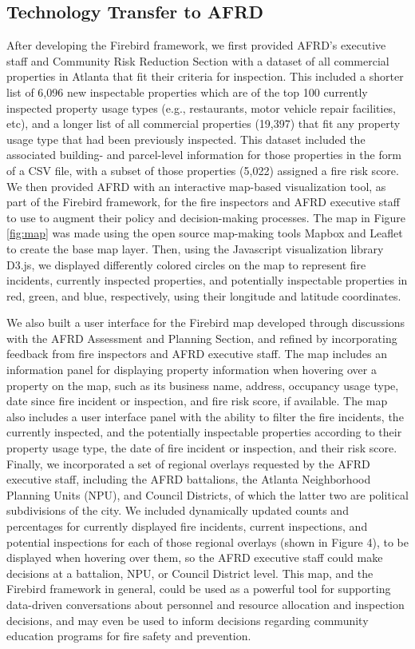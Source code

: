 \documentclass{sig-alternate-05-2015}
\begin{document}
{\subsection{Technology Transfer to AFRD}
After developing the Firebird framework, we first provided AFRD's executive staff and Community Risk Reduction Section with a dataset of all commercial properties in Atlanta that fit their criteria for inspection. This included a shorter list of 6,096 new inspectable properties which are of the top 100 currently inspected property usage types (e.g., restaurants, motor vehicle repair facilities, etc), and a longer list of all commercial properties (19,397) that fit any property usage type that had been previously inspected. This dataset included the associated building- and parcel-level information for those properties in the form of a CSV file, with a subset of those properties (5,022) assigned a fire risk score. We then provided AFRD with an interactive map-based visualization tool, as part of the Firebird framework, for the fire inspectors and AFRD executive staff to use to augment their policy and decision-making processes. The map in Figure \ref{fig:map} was made using the open source map-making tools Mapbox and Leaflet to create the base map layer. Then, using the Javascript visualization library D3.js, we displayed differently colored circles on the map to represent fire incidents, currently inspected properties, and potentially inspectable properties in red, green, and blue, respectively, using their longitude and latitude coordinates. 

We also built a user interface for the Firebird map developed through discussions with the AFRD Assessment and Planning Section, and refined by incorporating feedback from fire inspectors and AFRD executive staff. The map includes an information panel for displaying property information when hovering over a property on the map, such as its business name, address, occupancy usage type, date since fire incident or inspection, and fire risk score, if available. The map also includes a user interface panel with the ability to filter the fire incidents, the currently inspected, and the potentially inspectable properties according to their property usage type, the date of fire incident or inspection, and their risk score. Finally, we incorporated a set of regional overlays requested by the AFRD executive staff, including the AFRD battalions, the Atlanta Neighborhood Planning Units (NPU), and Council Districts, of which the latter two are political subdivisions of the city. We included dynamically updated counts and percentages for currently displayed fire incidents, current inspections, and potential inspections for each of those regional overlays (shown in Figure 4), to be displayed when hovering over them, so the AFRD executive staff could make decisions at a battalion, NPU, or Council District level. This map, and the Firebird framework in general, could be used as a powerful tool for supporting data-driven conversations about personnel and resource allocation and inspection decisions, and may even be used to inform decisions regarding community education programs for fire safety and prevention.


}
\end{document}
